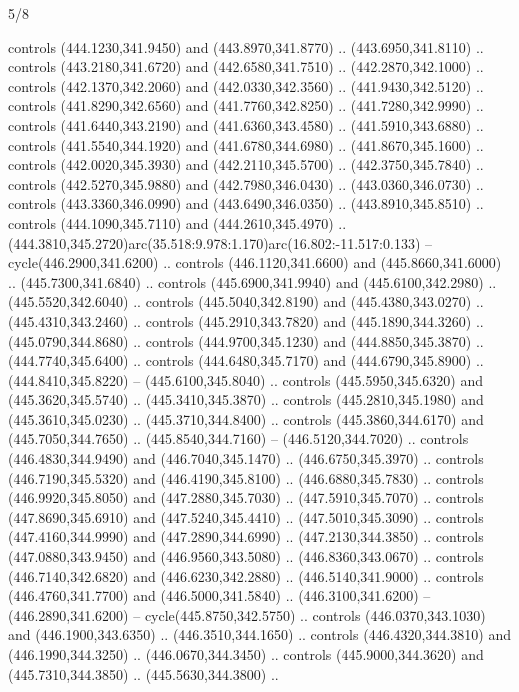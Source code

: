 \begin{flagdescription}{5/8}
\begin{scope}[xshift=0.5\flaglength,yshift=0.5\flagwidth,scale=\flagwidth/475.63]
\begin{scope}[y=0.8pt, x=0.8pt, yscale=-1, xscale=1,shift={(-450,-300)}]
\begin{scope}[cm={{1.0,0.0,0.0,1.0,(-0.0002,0.12556)}},cm={{1.0,0.0,0.0,1.0,(0.00179,0.0)}}]
\begin{scope}[cm={{1.01375,0.0,0.0,1.01375,(-5.36379,-4.94943)}}]
  controls (444.1230,341.9450) and (443.8970,341.8770) .. (443.6950,341.8110) ..
  controls (443.2180,341.6720) and (442.6580,341.7510) .. (442.2870,342.1000) ..
  controls (442.1370,342.2060) and (442.0330,342.3560) .. (441.9430,342.5120) ..
  controls (441.8290,342.6560) and (441.7760,342.8250) .. (441.7280,342.9990) ..
  controls (441.6440,343.2190) and (441.6360,343.4580) .. (441.5910,343.6880) ..
  controls (441.5540,344.1920) and (441.6780,344.6980) .. (441.8670,345.1600) ..
  controls (442.0020,345.3930) and (442.2110,345.5700) .. (442.3750,345.7840) ..
  controls (442.5270,345.9880) and (442.7980,346.0430) .. (443.0360,346.0730) ..
  controls (443.3360,346.0990) and (443.6490,346.0350) .. (443.8910,345.8510) ..
  controls (444.1090,345.7110) and (444.2610,345.4970) ..
  (444.3810,345.2720)arc(35.518:9.978:1.170)arc(16.802:-11.517:0.133) --
  cycle(446.2900,341.6200) .. controls (446.1120,341.6600) and
  (445.8660,341.6000) .. (445.7300,341.6840) .. controls (445.6900,341.9940) and
  (445.6100,342.2980) .. (445.5520,342.6040) .. controls (445.5040,342.8190) and
  (445.4380,343.0270) .. (445.4310,343.2460) .. controls (445.2910,343.7820) and
  (445.1890,344.3260) .. (445.0790,344.8680) .. controls (444.9700,345.1230) and
  (444.8850,345.3870) .. (444.7740,345.6400) .. controls (444.6480,345.7170) and
  (444.6790,345.8900) .. (444.8410,345.8220) -- (445.6100,345.8040) .. controls
  (445.5950,345.6320) and (445.3620,345.5740) .. (445.3410,345.3870) .. controls
  (445.2810,345.1980) and (445.3610,345.0230) .. (445.3710,344.8400) .. controls
  (445.3860,344.6170) and (445.7050,344.7650) .. (445.8540,344.7160) --
  (446.5120,344.7020) .. controls (446.4830,344.9490) and (446.7040,345.1470) ..
  (446.6750,345.3970) .. controls (446.7190,345.5320) and (446.4190,345.8100) ..
  (446.6880,345.7830) .. controls (446.9920,345.8050) and (447.2880,345.7030) ..
  (447.5910,345.7070) .. controls (447.8690,345.6910) and (447.5240,345.4410) ..
  (447.5010,345.3090) .. controls (447.4160,344.9990) and (447.2890,344.6990) ..
  (447.2130,344.3850) .. controls (447.0880,343.9450) and (446.9560,343.5080) ..
  (446.8360,343.0670) .. controls (446.7140,342.6820) and (446.6230,342.2880) ..
  (446.5140,341.9000) .. controls (446.4760,341.7700) and (446.5000,341.5840) ..
  (446.3100,341.6200) -- (446.2890,341.6200) -- cycle(445.8750,342.5750) ..
  controls (446.0370,343.1030) and (446.1900,343.6350) .. (446.3510,344.1650) ..
  controls (446.4320,344.3810) and (446.1990,344.3250) .. (446.0670,344.3450) ..
  controls (445.9000,344.3620) and (445.7310,344.3850) .. (445.5630,344.3800) ..

\end{scope}
\end{scope}
\end{scope}
\end{scope}
\end{flagdescription}
